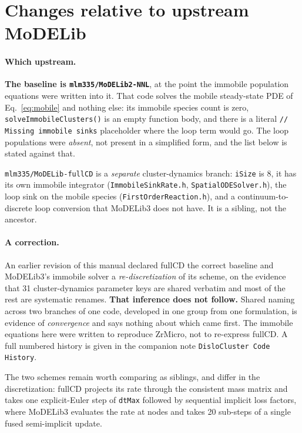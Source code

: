\documentclass[11pt]{article}
\newcommand{\MoD}{\textsf{MoDELib3}}
\newcommand{\code}[1]{\texttt{\small #1}}
\newcommand{\file}[1]{\texttt{\footnotesize #1}}
\begin{document}
\section{Changes relative to upstream MoDELib}
\label{app:changes}

\paragraph{Which upstream.} \textbf{The baseline is \file{mlm335/MoDELib2-NNL}},
at the point the immobile population equations were written into it. That code
solves the mobile steady-state PDE of Eq.~\eqref{eq:mobile} and nothing else:
its immobile species count is zero, \code{solveImmobileClusters()} is an empty
function body, and there is a literal \code{// Missing immobile sinks}
placeholder where the loop term would go. The loop populations were
\emph{absent}, not present in a simplified form, and the list below is stated
against that.

\file{mlm335/MoDELib-fullCD} is a \emph{separate} cluster-dynamics branch:
\code{iSize} is 8, it has its own immobile integrator
(\file{ImmobileSinkRate.h}, \file{SpatialODESolver.h}), the loop sink on the
mobile species (\file{FirstOrderReaction.h}), and a continuum-to-discrete loop
conversion that \MoD{} does not have. It is a sibling, not the ancestor.

\paragraph{A correction.} An earlier revision of this manual declared fullCD the
correct baseline and \MoD{}'s immobile solver a \emph{re-discretization} of its
scheme, on the evidence that 31 cluster-dynamics parameter keys are shared
verbatim and most of the rest are systematic renames. \textbf{That inference
does not follow.} Shared naming across two branches of one code, developed in
one group from one formulation, is evidence of \emph{convergence} and says
nothing about which came first. The immobile equations here were written to
reproduce ZrMicro, not to re-express fullCD. A full numbered history is given in
the companion note \file{DisloCluster Code History}.

The two schemes remain worth comparing as siblings, and differ in the
discretization: fullCD projects its rate through the consistent mass matrix and
takes one explicit-Euler step of \code{dtMax} followed by sequential implicit
loss factors, where \MoD{} evaluates the rate at nodes and takes 20 sub-steps of
a single fused semi-implicit update.
\end{document}
